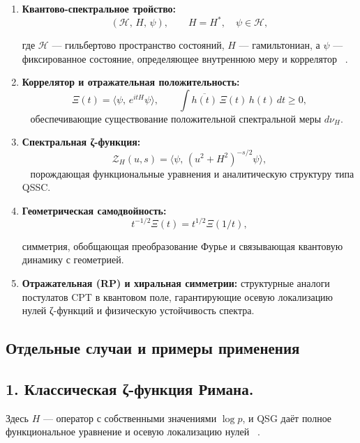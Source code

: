 \documentclass{article}
\numberwithin{equation}{section}
\theoremstyle{plain}
\theoremstyle{definition}
\theoremstyle{remark}
\begin{document}
\begin{enumerate}
\item \textbf{Квантово-спектральное тройство:}
\begin{equation}
(\mathcal H,\, H,\, \psi),
\qquad H=H^\ast,\quad \psi\in\mathcal H,
\label{eq:QSSC0056}
\end{equation}

где \(\mathcal H\) — гильбертово пространство состояний, \(H\) — гамильтониан,  
а \(\psi\) — фиксированное состояние, определяющее внутреннюю меру и коррелятор ~\cite{ConnesMarcolli2008}.

\item \textbf{Коррелятор и отражательная положительность:}
\begin{equation}
\Xi(t)=\langle\psi,\,e^{itH}\psi\rangle,\qquad 
\int\!\overline{h(t)}\,\Xi(t)\,h(t)\,dt \ge 0,
\label{eq:QSSC0057}
\end{equation}
~\cite{OsterwalderSchrader1973, Jaffe2007}
обеспечивающие существование положительной спектральной меры \(d\nu_H\).

\item \textbf{Спектральная ζ-функция:}
\begin{equation}
\mathcal Z_H(u,s)=\langle\psi,\,(u^2+H^2)^{-s/2}\psi\rangle,
\label{eq:QSSC0058}
\end{equation}
~\cite{Elizalde1995, Seeley1967}
порождающая функциональные уравнения и аналитическую структуру типа QSSC.

\item \textbf{Геометрическая самодвойность:}
\begin{equation}
t^{-1/2}\Xi(t)=t^{1/2}\Xi(1/t),
\label{eq:QSSC0059}
\end{equation}

симметрия, обобщающая преобразование Фурье и связывающая квантовую динамику с геометрией.

\item \textbf{Отражательная (RP) и хиральная симметрии:}
структурные аналоги постулатов CPT в квантовом поле, 
гарантирующие осевую локализацию нулей ζ-функций и физическую устойчивость спектра.
\end{enumerate}

\subsection*{Отдельные случаи и примеры применения}

\subsection*{1. Классическая ζ-функция Римана.}
Здесь \(H\) — оператор с собственными значениями \(\log p\), и QSG даёт полное функциональное уравнение и осевую локализацию нулей ~\cite{BerryKeating1999, Connes1999}.
\end{document}
